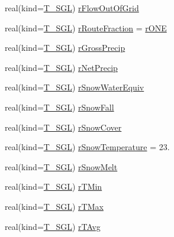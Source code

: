 \begin{DoxyCompactItemize}
\item 
real(kind=\hyperlink{namespacetypes_af3012489af4c138f271f1bce244b7e51}{T\_\-SGL}) \hyperlink{typetypes_1_1_t___c_e_l_l_adcfb3d823e339db1f3cf8521b30ae0a8}{rFlowOutOfGrid}
\item 
real(kind=\hyperlink{namespacetypes_af3012489af4c138f271f1bce244b7e51}{T\_\-SGL}) \hyperlink{typetypes_1_1_t___c_e_l_l_ab4267240a1e16d985fe629e530e30942}{rRouteFraction} = \hyperlink{namespacetypes_a94afcebb08a1e89087d5ffb5a7585b72}{rONE}
\item 
real(kind=\hyperlink{namespacetypes_af3012489af4c138f271f1bce244b7e51}{T\_\-SGL}) \hyperlink{typetypes_1_1_t___c_e_l_l_aa643c443df7bde324d32b00c2c1d80a6}{rGrossPrecip}
\item 
real(kind=\hyperlink{namespacetypes_af3012489af4c138f271f1bce244b7e51}{T\_\-SGL}) \hyperlink{typetypes_1_1_t___c_e_l_l_a4b867c007a72c8134a3ebf207885c48d}{rNetPrecip}
\item 
real(kind=\hyperlink{namespacetypes_af3012489af4c138f271f1bce244b7e51}{T\_\-SGL}) \hyperlink{typetypes_1_1_t___c_e_l_l_a4f3f2be4779ed929d5c545714eda0fd5}{rSnowWaterEquiv}
\item 
real(kind=\hyperlink{namespacetypes_af3012489af4c138f271f1bce244b7e51}{T\_\-SGL}) \hyperlink{typetypes_1_1_t___c_e_l_l_abe6f010412795d217a4f33cefd3fa8c5}{rSnowFall}
\item 
real(kind=\hyperlink{namespacetypes_af3012489af4c138f271f1bce244b7e51}{T\_\-SGL}) \hyperlink{typetypes_1_1_t___c_e_l_l_a6a9988e654fe9666f76e7724a523a25e}{rSnowCover}
\item 
real(kind=\hyperlink{namespacetypes_af3012489af4c138f271f1bce244b7e51}{T\_\-SGL}) \hyperlink{typetypes_1_1_t___c_e_l_l_a1f942e1761770a081d65e6b569792855}{rSnowTemperature} = 23.
\item 
real(kind=\hyperlink{namespacetypes_af3012489af4c138f271f1bce244b7e51}{T\_\-SGL}) \hyperlink{typetypes_1_1_t___c_e_l_l_afd5e205c3d0e9181f790251604bee34e}{rSnowMelt}
\item 
real(kind=\hyperlink{namespacetypes_af3012489af4c138f271f1bce244b7e51}{T\_\-SGL}) \hyperlink{typetypes_1_1_t___c_e_l_l_a806f1f12b64f811d0100cf0fe1bd1b29}{rTMin}
\item 
real(kind=\hyperlink{namespacetypes_af3012489af4c138f271f1bce244b7e51}{T\_\-SGL}) \hyperlink{typetypes_1_1_t___c_e_l_l_a550cda256cb70da1d3648ffc0f40363e}{rTMax}
\item 
real(kind=\hyperlink{namespacetypes_af3012489af4c138f271f1bce244b7e51}{T\_\-SGL}) \hyperlink{typetypes_1_1_t___c_e_l_l_ae7d215233d7fd0ea9d5b2fbd3a4fe8b3}{rTAvg}

\end{DoxyCompactItemize}
